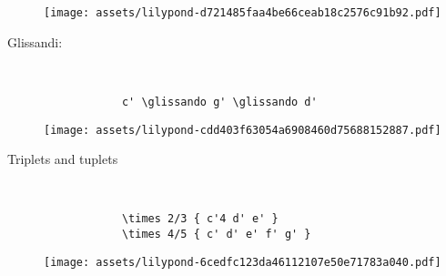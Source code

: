 \documentclass[a4paper]{tufte-handout}
\newenvironment{abjadbookoutput}{}{}
\begin{document}
\begin{description}
\begin{multicols}{2}
            \begin{abjadbookoutput}
            \noindent\texttt{[image: assets/lilypond-d721485faa4be66ceab18c2576c91b92.pdf]}
            \end{abjadbookoutput}

        \end{multicols}

    \item[Glissandi:]
        \hfill \vspace{-\baselineskip} \\
        \begin{multicols}{2}

            \begin{verbatim}
            c' \glissando g' \glissando d'
            \end{verbatim}

            \begin{comment}
            <lilypond>[stylesheet=stylesheet-minimal.ily]
            { c' \glissando g' \glissando d' }
            </lilypond>
            \end{comment}

            \begin{abjadbookoutput}
            \noindent\texttt{[image: assets/lilypond-cdd403f63054a6908460d75688152887.pdf]}
            \end{abjadbookoutput}

        \end{multicols}

    \item[Triplets and tuplets]
        \hfill \vspace{-\baselineskip} \\
        \begin{multicols}{2}

            \begin{verbatim}
            \times 2/3 { c'4 d' e' }
            \times 4/5 { c' d' e' f' g' }
            \end{verbatim}

            \begin{comment}
            <lilypond>[stylesheet=stylesheet-minimal.ily]
            {
                \times 2/3 { c'4 d' e' }
                \times 4/5 { c' d' e' f' g' }
            }
            </lilypond>
            \end{comment}

            \begin{abjadbookoutput}
            \noindent\texttt{[image: assets/lilypond-6cedfc123da46112107e50e71783a040.pdf]}
            \end{abjadbookoutput}


\end{multicols}
\end{description}
\end{document}
